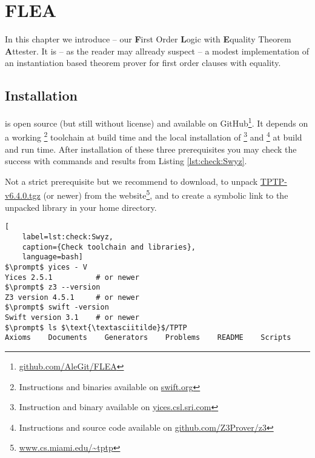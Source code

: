 
\chapter{FLEA}



In this chapter we introduce \FLEA --
our \textbf{F}irst Order \textbf{L}ogic with \textbf{E}quality Theorem \textbf{A}ttester. 
It is 
-- as the reader may allready suspect --
a modest implementation of an instantiation based theorem prover for first order clauses with equality.


\section{Installation}

\FLEA is open source (but still without license) and available on GitHub\footnote{
	\href{https://github.com/AleGit/FLEA}{github.com/AleGit/FLEA}
}. It depends on a working \Swift\footnote{
	Instructions and binaries available on \href{https://swift.org}{swift.org}
} toolchain at build time and the local installation of 
\Yices\footnote{
	Instruction and binary available on \href{http://yices.csl.sri.com}{yices.csl.sri.com}
}
and \Ziii\footnote{
	Instructions and source code available on \href{https://github.com/Z3Prover/z3}{github.com/Z3Prover/z3}
} at build and run time. After installation of these three prerequisites you may check the success with commands and results from Listing \ref{lst:check:Swyz}. 

Not a strict prerequisite but we recommend to download, to unpack \href{http://www.cs.miami.edu/~tptp/TPTP/Distribution/TPTP-v6.4.0.tgz}{TPTP-v6.4.0.tgz} (or newer)
from the \TPTP website\footnote{
	\href{http://www.cs.miami.edu/~tptp/}{www.cs.miami.edu/\textasciitilde tptp}
}, and to create a symbolic link to the unpacked library in your home directory.
\begin{lstlisting}[
	label=lst:check:Swyz,
	caption={Check toolchain and libraries},
	language=bash]
$\prompt$ yices - V
Yices 2.5.1          # or newer
$\prompt$ z3 --version
Z3 version 4.5.1     # or newer
$\prompt$ swift -version
Swift version 3.1    # or newer
$\prompt$ ls $\text{\textasciitilde}$/TPTP
Axioms    Documents    Generators    Problems    README    Scripts
\end{lstlisting}

